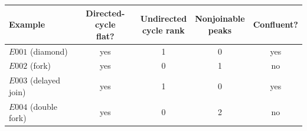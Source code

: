 \small
\begin{tabular}{@{}lcccc@{}}
\toprule
Example & \shortstack{Directed-cycle\\flat?} & \shortstack{Undirected\\cycle rank} & \shortstack{Nonjoinable\\peaks} & Confluent? \\
\midrule
$E001$ (diamond)           & yes & 1 & 0 & yes \\
$E002$ (fork)              & yes & 0 & 1 & no \\
$E003$ (delayed join)      & yes & 1 & 0 & yes \\
$E004$ (double fork)       & yes & 0 & 2 & no \\
\bottomrule
\end{tabular}
